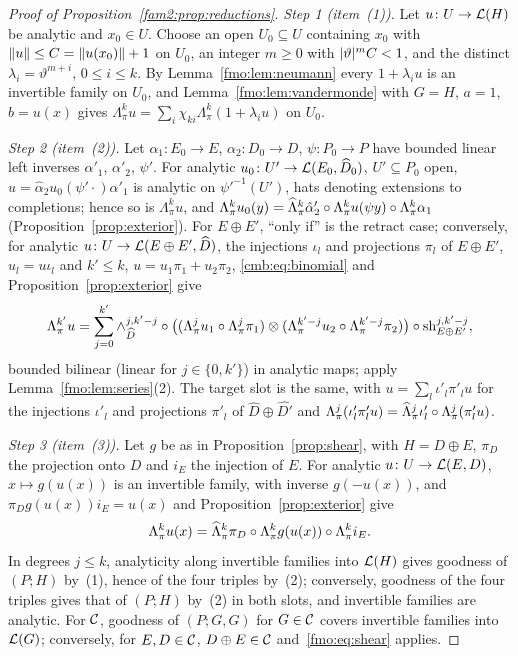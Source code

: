 \begin{proof}[Proof of Proposition~\ref{fam2:prop:reductions}]
\emph{Step 1 (item~(1)).} Let $u\colon U\to\mathcal L(H)$ be analytic and $x_0\in U$. Choose an open $U_0\subseteq U$
containing $x_0$ with $\lVert u\rVert\le C=\lVert u(x_0)\rVert+1$ on $U_0$, an integer $m\ge0$ with $\lvert \vartheta\rvert^mC<1$, and the
distinct $\lambda_i=\vartheta^{m+i}$, $0\le i\le k$. By Lemma~\ref{fmo:lem:neumann} every $1+\lambda_iu$ is an invertible
family on $U_0$, and Lemma~\ref{fmo:lem:vandermonde} with $G=H$, $a=1$, $b=u(x)$ gives
$\Lambda^k_\pi u=\sum_i\chi_{ki}\Lambda^k_\pi(1+\lambda_iu)$ on $U_0$.

\emph{Step 2 (item~(2)).} Let $\alpha_1\colon E_0\to E$, $\alpha_2\colon D_0\to D$, $\psi\colon P_0\to P$ have bounded linear
left inverses $\alpha'_1$, $\alpha'_2$, $\psi'$. For analytic $u_0\colon U'\to\mathcal L(E_0,\widehat D_0)$, $U'\subseteq P_0$
open, $u=\hat\alpha_2u_0(\psi'\cdot)\alpha'_1$ is analytic on $\psi'^{-1}(U')$, hats denoting extensions to completions;
hence so is $\Lambda^k_\pi u$, and $\Lambda^k_\pi u_0(y)=\widehat\Lambda^k_\pi\hat\alpha'_2\circ\Lambda^k_\pi u(\psi y)\circ
\Lambda^k_\pi\alpha_1$ (Proposition~\ref{prop:exterior}). For $E\oplus E'$, ``only if'' is the retract case; conversely,
for analytic $u\colon U\to\mathcal L(E\oplus E',\widehat D)$, the injections $\iota_l$ and projections $\pi_l$ of $E\oplus E'$,
$u_l=u\iota_l$ and $k'\le k$, $u=u_1\pi_1+u_2\pi_2$, \eqref{cmb:eq:binomial} and Proposition~\ref{prop:exterior} give
\[\Lambda^{k'}_\pi u=\sum_{j=0}^{k'}\wedge^{j,k'-j}_{\widehat D}\circ\bigl((\Lambda^j_\pi u_1\circ\Lambda^j_\pi\pi_1)\otimes
(\Lambda^{k'-j}_\pi u_2\circ\Lambda^{k'-j}_\pi\pi_2)\bigr)\circ\operatorname{sh}^{j,k'-j}_{E\oplus E'},\]
bounded bilinear (linear for $j\in\{0,k'\}$) in analytic maps; apply Lemma~\ref{fmo:lem:series}(2). The target slot is the
same, with $u=\sum_l\iota'_l\pi'_lu$ for the injections $\iota'_l$ and projections $\pi'_l$ of
$\widehat D\oplus\widehat{D'}$ and $\Lambda^j_\pi(\iota'_l\pi'_lu)=\widehat\Lambda^j_\pi\iota'_l\circ\Lambda^j_\pi(\pi'_lu)$.

\emph{Step 3 (item~(3)).} Let $g$ be as in Proposition~\ref{prop:shear}, with $H=D\oplus E$, $\pi_D$ the projection onto
$D$ and $i_E$ the injection of $E$. For analytic $u\colon U\to\mathcal L(E,D)$, $x\mapsto g(u(x))$ is an invertible family, with
inverse $g(-u(x))$, and $\pi_Dg(u(x))i_E=u(x)$ and Proposition~\ref{prop:exterior} give
\begin{equation}\label{fmo:eq:shear}
 \Lambda^k_\pi u(x)=\widehat\Lambda^k_\pi\pi_D\circ\Lambda^k_\pi g(u(x))\circ\Lambda^k_\pi i_E .
\end{equation}
In degrees $j\le k$, analyticity along invertible families into $\mathcal L(H)$ gives goodness of $(P;H)$ by~(1), hence of the
four triples by~(2); conversely, goodness of the four triples gives that of $(P;H)$ by~(2) in both slots, and invertible
families are analytic. For $\mathcal{C}$, goodness of $(P;G,G)$ for $G\in\mathcal{C}$ covers invertible families into $\mathcal L(G)$;
conversely, for $E,D\in\mathcal{C}$, $D\oplus E\in\mathcal{C}$ and~\eqref{fmo:eq:shear} applies.
\end{proof}

